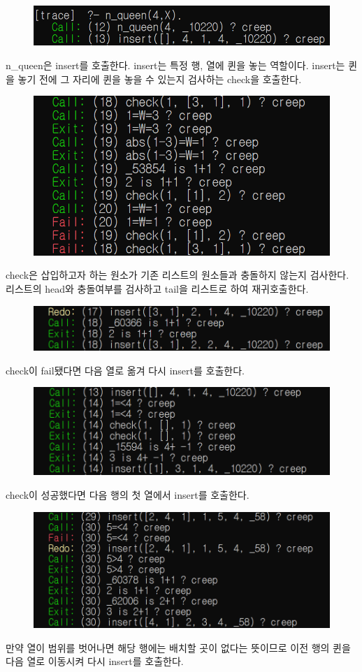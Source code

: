 \documentclass{oblivoir}
\begin{document}
\begin{figure}[h]
 
    \includegraphics[width=0.5\linewidth]{trace_b1.PNG}
   
\end{figure}
n\_queen은 insert를 호출한다. insert는 특정 행, 열에 퀸을 놓는 역할이다. insert는 퀸을 놓기 전에 그 자리에 퀸을 놓을 수 있는지 검사하는 check을 호출한다.

\begin{figure}[h]
  
    \includegraphics[width=0.5\linewidth]{trace_b2.PNG}
   
\end{figure}
check은 삽입하고자 하는 원소가 기존 리스트의 원소들과 충돌하지 않는지 검사한다. 리스트의 head와 충돌여부를 검사하고 tail을 리스트로 하여 재귀호출한다. 

\begin{figure}[H]
  
    \includegraphics[width=0.5\linewidth]{trace_b3.PNG}
    
\end{figure}
check이 fail됐다면 다음 열로 옮겨 다시 insert를 호출한다.

\begin{figure}[H]

    \includegraphics[width=0.5\linewidth]{trace_b4.PNG}
   
\end{figure}
check이 성공했다면 다음 행의 첫 열에서 insert를 호출한다.

\begin{figure}[H]
  
    \includegraphics[width=0.5\linewidth]{trace_b5.PNG}
    
\end{figure}
만약 열이 범위를 벗어나면 해당 행에는 배치할 곳이 없다는 뜻이므로 이전 행의 퀸을 다음 열로 이동시켜 다시 insert를 호출한다.
\end{document}
